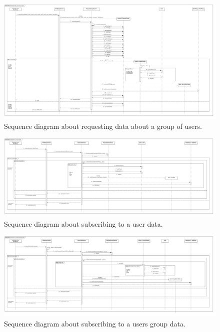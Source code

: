 \begin{figure}[h!]
	\includegraphics[width=1.0\textwidth]{./pictures/sequence_groupRequest.png}\par
	\caption{Sequence diagram about requesting data about a group of users.}
\end{figure}
\FloatBarrier 

\begin{figure}[h!]
	\includegraphics[width=1.0\textwidth]{./pictures/sequence_userSubscribe.png}\par
	\caption{Sequence diagram about subscribing to a user data.}
\end{figure}
\FloatBarrier 

\begin{figure}[h!]
	\includegraphics[width=1.0\textwidth]{./pictures/sequence_groupSubscribe.png}\par
	\caption{Sequence diagram about subscribing to a users group data.}
\end{figure}
\FloatBarrier 


